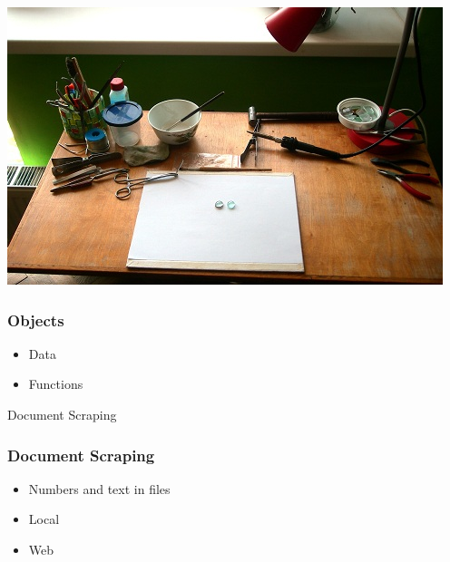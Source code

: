 \documentclass[20pt]{beamer}
\begin{document}
\begin{frame}
	\vspace*{-1mm}
	\hspace*{-12mm}
	\href{http://www.fler.cz/files/u/5/1/u5113/DSCN9921aaa.jpg}{\includegraphics[height=1.1\textheight]{DSCN9921aaa.jpg}}
\end{frame}


\begin{frame}
	\frametitle{Objects}
	\begin{itemize}
		\item 	Data
		\item 	Functions
	\end{itemize}
\end{frame}


\begin{frame}
  \huge{	
  \begin{center}
	{\color{DG} Document Scraping}
  \end{center}
  }
\end{frame}


\begin{frame}
	\frametitle{Document Scraping}
	\begin{itemize}
		\item 	Numbers and text in files
		\item 	Local
        \item   Web 
	\end{itemize}
\end{frame}
\end{document}
